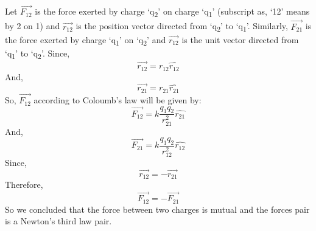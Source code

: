 Let $\vec{F_{12}}$ is the force exerted by charge `q\textsubscript{2}' on charge `q\textsubscript{1}' (subscript as, `12' means by 2 on 1)
and $\vec{r_{12}}$ is the position vector directed from `q\textsubscript{2}' to `q\textsubscript{1}'.
Similarly, $\vec{F_{21}}$  is the force exerted by charge `q\textsubscript{1}' on `q\textsubscript{2}' and  $\vec{r_{12}}$ is
the unit vector directed from `q\textsubscript{1}' to `q\textsubscript{2}'.
Since,
\begin{equation}
  \vec{r_{12}} = r_{12} \hat{r_{12}} \nonumber
\end{equation}
And,
\begin{equation}
  \vec{r_{21}} = r_{21} \hat{r_{21}} \nonumber
\end{equation}
So, $\vec{F_{12}}$ according to Coloumb's law will be given by:
\begin{equation}
  \vec{F_{12}} = k \frac{q_{1}q_{2}}{r_{21}^{2}} \hat{r_{21}} \nonumber
\end{equation}
And,
\begin{equation}
  \vec{F_{21}} = k \frac{q_{1}q_{2}}{r_{12}^{2}} \hat{r_{12}} \nonumber
\end{equation}
Since,
\begin{equation}
  \vec{r_{12}} = -\vec{r_{21}} \nonumber
\end{equation}
Therefore,
\begin{equation}
  \vec{F_{12}} = -\vec{F_{21}} \nonumber
\end{equation}
So we concluded that the force between two charges is
mutual and the forces pair is a Newton's third law pair.

